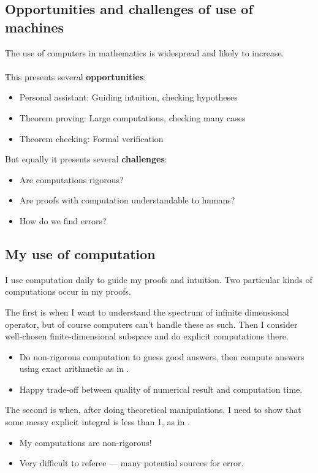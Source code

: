 \subsection{Opportunities and challenges of use of machines}
The use of computers in mathematics is widespread and likely to increase.\\
\hfill\\
This presents several \textbf{opportunities}:
\begin{itemize}
\item Personal assistant: Guiding intuition, checking hypotheses
\item Theorem proving: Large computations, checking many cases
\item Theorem checking: Formal verification
\end{itemize}
But equally it presents several \textbf{challenges}:
\begin{itemize}
\item Are computations rigorous?
\item Are proofs with computation understandable to humans?
\item How do we find errors?
\end{itemize}


\subsection{My use of computation}
I use computation daily to guide my proofs and intuition.
Two particular kinds of computations occur in my proofs.
\par
The first is when I want to understand the spectrum of infinite dimensional operator, but of course computers can't handle these as such. Then I consider well-chosen finite-dimensional subspace and do explicit computations there.
\begin{itemize}
\item Do non-rigorous computation to guess good answers, then compute answers using exact arithmetic as in \cite{Maynard2015a}.
\item Happy trade-off between quality of numerical result and computation time.
\end{itemize}%
The second is when, after doing theoretical manipulations, I need to show that some messy explicit integral is less than 1, as in \cite{Maynard2013a}.
\begin{itemize}
\item My computations are non-rigorous!
\item Very difficult to referee --- many potential sources for error.
\end{itemize}
